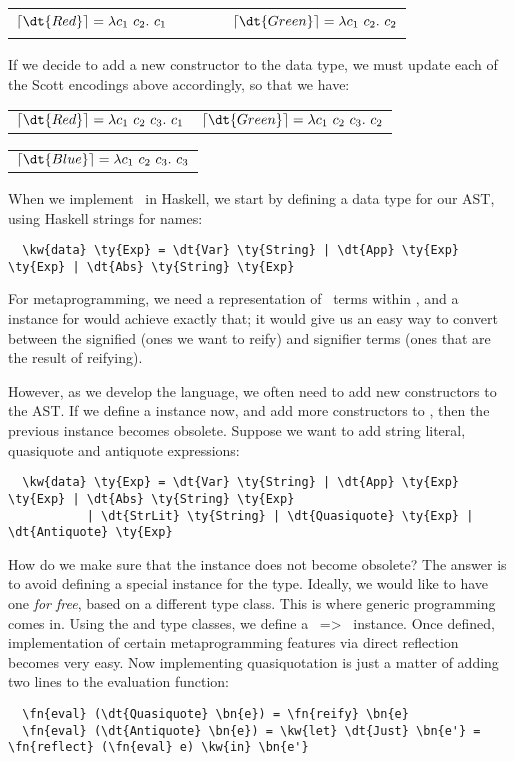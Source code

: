 \begin{center}
\begin{tabular}{c c c}
  $\enco{\dt{Red}} = \lambda c_1\ c_2.\ c_1$ & \ \ \ \ &
    $\enco{\dt{Green}} = \lambda c_1\ c_2.\ c_2$
\end{tabular}
\end{center}

If we decide to add a new constructor  to the  data type, we must update each of the Scott encodings above accordingly, so that we have:
\begin{center}
\begin{tabular}{c c}
  $\enco{\dt{Red}} = \lambda c_1\ c_2\ c_3.\ c_1$ &
    $\enco{\dt{Green}} = \lambda c_1\ c_2\ c_3.\ c_2$
\end{tabular}
\begin{tabular}{c}
    $\enco{\dt{Blue}} = \lambda c_1\ c_2\ c_3.\ c_3$
\end{tabular}
\end{center}

When we implement \lc\ in Haskell, we start by defining a data type for our AST, using Haskell strings for names:
\begin{Verbatim}
  \kw{data} \ty{Exp} = \dt{Var} \ty{String} | \dt{App} \ty{Exp} \ty{Exp} | \dt{Abs} \ty{String} \ty{Exp}
\end{Verbatim}
For metaprogramming, we need a representation of \lc\ terms within \lc, and a  instance for  would achieve exactly that; it would give us an easy way to convert between the signified (ones we want to reify) and signifier terms (ones that are the result of reifying).

However, as we develop the language, we often need to add new constructors to the AST.
If we define a  instance now, and add more constructors to , then the previous  instance becomes obsolete.
Suppose we want to add string literal, quasiquote and antiquote expressions:
\begin{Verbatim}
  \kw{data} \ty{Exp} = \dt{Var} \ty{String} | \dt{App} \ty{Exp} \ty{Exp} | \dt{Abs} \ty{String} \ty{Exp}
           | \dt{StrLit} \ty{String} | \dt{Quasiquote} \ty{Exp} | \dt{Antiquote} \ty{Exp}
\end{Verbatim}
How do we make sure that the  instance does not become obsolete?
The answer is to avoid defining a special  instance for the  type.
Ideally, we would like to have one \emph{for free}, based on a different type class. This is where generic programming comes in. Using the  and  type classes, we define a \mbox{  =>  } instance.
Once defined, implementation of certain metaprogramming features via direct reflection becomes very easy. Now implementing quasiquotation is just a matter of adding two lines to the evaluation function:
\begin{Verbatim}
  \fn{eval} (\dt{Quasiquote} \bn{e}) = \fn{reify} \bn{e}
  \fn{eval} (\dt{Antiquote} \bn{e}) = \kw{let} \dt{Just} \bn{e'} = \fn{reflect} (\fn{eval} e) \kw{in} \bn{e'}
\end{Verbatim}

